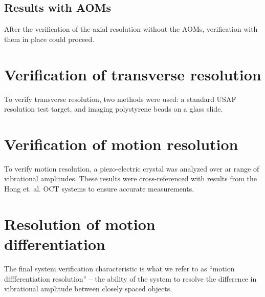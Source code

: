 \subsection{Results with AOMs}

After the verification of the axial resolution without the AOMs, verification with them in place could proceed.

\section{Verification of transverse resolution}

To verify transverse resolution, two methods were used: a standard USAF resolution test target, and imaging polystyrene beads on a glass slide.

\section{Verification of motion resolution}

To verify motion resolution, a piezo-electric crystal was analyzed over ar range of vibrational amplitudes. These results were cross-referenced with results from the Hong et. al. OCT systems to ensure accurate measurements.

\section{Resolution of motion differentiation}

The final system verification characteristic is what we refer to as ``motion diffferentiation resolution'' -- the ability of the system to resolve the difference in vibrational amplitude between closely spaced objects.